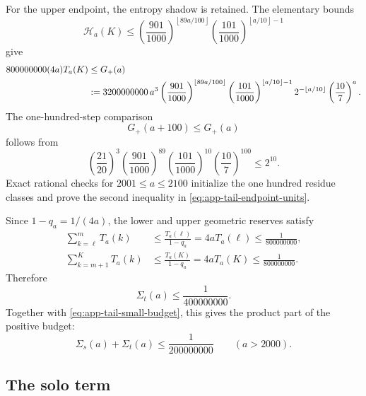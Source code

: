 \documentclass[11pt]{article}
\theoremstyle{definition}
\theoremstyle{remark}
\newcommand{\floor}[1]{\left\lfloor #1\right\rfloor}
\begin{document}
For the upper endpoint, the entropy shadow is retained.  The elementary
bounds
\begin{equation}\label{eq:app-tail-upper-entropy}
 \mathcal H_a(K)
 \le
 \left(\frac{901}{1000}\right)^{\floor{89a/100}}
 \left(\frac{101}{1000}\right)^{\floor{a/10}-1}
\end{equation}
give
\begin{align}
 800000000(4a)T_a(K)
 &\le G_+(a)\notag\\
 &:={}
 3200000000\,a^3
 \left(\frac{901}{1000}\right)^{\floor{89a/100}}
 \left(\frac{101}{1000}\right)^{\floor{a/10}-1}
 2^{-\floor{a/10}}
 \left(\frac{10}{7}\right)^a.
 \label{eq:app-tail-Gplus}
\end{align}
The one-hundred-step comparison
\begin{equation}\label{eq:app-tail-Gplus-step}
 G_+(a+100)\le G_+(a)
\end{equation}
follows from
\begin{equation}\label{eq:app-tail-Gplus-constants}
 \left(\frac{21}{20}\right)^3
 \left(\frac{901}{1000}\right)^{89}
 \left(\frac{101}{1000}\right)^{10}
 \left(\frac{10}{7}\right)^{100}
 \le2^{10}.
\end{equation}
Exact rational checks for $2001\le a\le2100$ initialize the one hundred
residue classes and prove the second inequality in
\eqref{eq:app-tail-endpoint-units}.

Since $1-q_a=1/(4a)$, the lower and upper geometric reserves satisfy
\begin{align}
 \sum_{k=\ell}^{m}T_a(k)
 &\le\frac{T_a(\ell)}{1-q_a}
  =4aT_a(\ell)\le\frac1{800000000},
 \label{eq:app-tail-lower-budget}\\
 \sum_{k=m+1}^{K}T_a(k)
 &\le\frac{T_a(K)}{1-q_a}
  =4aT_a(K)\le\frac1{800000000}.
 \label{eq:app-tail-upper-budget}
\end{align}
Therefore
\begin{equation}\label{eq:app-tail-tempered-budget}
 \Sigma_t(a)\le\frac1{400000000}.
\end{equation}
Together with \eqref{eq:app-tail-small-budget}, this gives the product part of
the positive budget:
\begin{equation}\label{eq:app-tail-product-budget}
 \Sigma_s(a)+\Sigma_t(a)\le\frac1{200000000}
 \qquad(a>2000).
\end{equation}

\subsection{The solo term}
\end{document}
